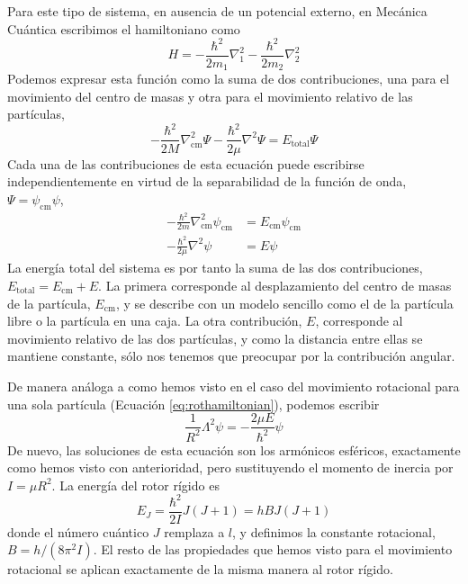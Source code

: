 \documentclass{tufte-handout}
\begin{document}
Para este tipo de sistema, en ausencia de un potencial 
externo, en Mecánica Cuántica escribimos el hamiltoniano
como 
\begin{equation}
    H=-\frac{\hbar^2}{2m_1}\nabla_1^2-\frac{\hbar^2}{2m_2}\nabla_2^2
\end{equation}
Podemos expresar esta función como la suma de dos 
contribuciones, una para el movimiento del centro de 
masas y otra para el movimiento relativo de las partículas,
\begin{equation}
    -\frac{\hbar^2}{2M}\nabla_\mathrm{cm}^2\Psi 
    -\frac{\hbar^2}{2\mu}\nabla^2\Psi=E_\mathrm{total}\Psi
\end{equation}
Cada una de las contribuciones de esta ecuación puede 
escribirse independientemente en virtud de la separabilidad 
de la función de onda, $\Psi=\psi_\mathrm{cm}\psi$,
\begin{subequations}
    \begin{align}
        -\frac{\hbar^2}{2m}\nabla^2_\mathrm{cm}\psi_\mathrm{cm}&=
        E_\mathrm{cm}\psi_\mathrm{cm} \\
        -\frac{\hbar^2}{2\mu}\nabla^2\psi&=
        E\psi
    \end{align}
\end{subequations}
La energía total del sistema es por tanto la suma de 
las dos contribuciones, $E_\mathrm{total}=E_\mathrm{cm}+E$.
La primera corresponde al desplazamiento del centro de 
masas de la partícula, $E_\mathrm{cm}$, y se describe 
con un modelo sencillo como el de la partícula 
libre o la partícula en una caja. La otra contribución,
$E$, corresponde
al movimiento relativo de las dos 
partículas, y como la distancia entre
ellas se mantiene constante, sólo nos 
tenemos que preocupar por la 
contribución angular. 

De manera análoga a como hemos visto en el caso 
del movimiento rotacional para una sola partícula 
(Ecuación \ref{eq:rothamiltonian}), podemos
escribir
\begin{equation}
\frac{1}{R^2}\Lambda^2\psi=-\frac{2\mu E}{\hbar^2}\psi
\label{eq:rotor}
\end{equation}
De nuevo, las soluciones de esta ecuación son los 
armónicos esféricos, exactamente como hemos visto con
anterioridad, pero sustituyendo el momento de
inercia por $I=\mu R^2$. La energía del rotor rígido es 
\begin{equation}
    E_J=\frac{\hbar^2}{2I}J(J+1)=hBJ(J+1)
\end{equation}
donde el número cuántico $J$ remplaza a $l$, y 
definimos la constante rotacional, $B=h/(8\pi^2I)$. 
El resto de las propiedades que hemos visto para el
movimiento rotacional se aplican exactamente de la 
misma manera al rotor rígido.
\end{document}
